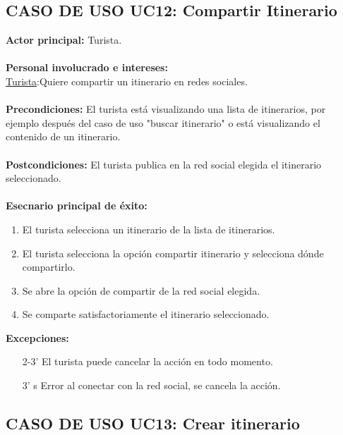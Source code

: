 \documentclass[12pt]{article}
\begin{document}
\subsection{\textbf{CASO DE USO UC12: Compartir Itinerario}  }
\textbf{Actor principal:} Turista.\\
\\
\textbf{Personal involucrado e intereses: }\\
\underline{Turista}:Quiere compartir un itinerario en redes sociales.
\\\\
\textbf{Precondiciones:} El turista está visualizando una lista de itinerarios, por ejemplo después del caso de uso "buscar itinerario" o está visualizando el contenido de un itinerario.\\
\\
\textbf{Postcondiciones:} El turista publica en la red social elegida el itinerario seleccionado.\\
\\
\textbf{Esecnario principal de éxito:}
\begin{enumerate}
\item El turista selecciona un itinerario de la lista de itinerarios.
\item El turista selecciona la opción compartir itinerario y selecciona dónde compartirlo.
\item Se abre la opción de compartir de la red social elegida.
\item Se comparte satisfactoriamente el itinerario seleccionado.
\end{enumerate}
\textbf{Excepciones:}
\begin{enumerate}
\item[2-3'] El turista puede cancelar la acción en todo momento.
\item[3']s Error al conectar con la red social, se cancela la acción.
\end{enumerate}
\newpage
\subsection{\textbf{CASO DE USO UC13:} Crear itinerario }
\end{document}
